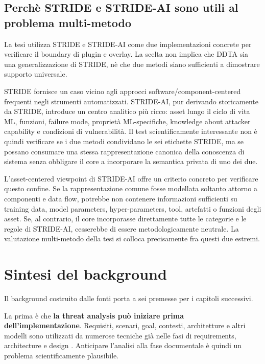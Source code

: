 \documentclass[12pt,a4paper,oneside]{report}
\begin{document}
\subsection{Perchè STRIDE e STRIDE-AI sono utili al problema multi-metodo}

La tesi utilizza STRIDE e STRIDE-AI come due implementazioni concrete per verificare il boundary di plugin e overlay. La scelta non implica che DDTA sia una generalizzazione di STRIDE, nè che due metodi siano sufficienti a dimostrare supporto universale.

STRIDE fornisce un caso vicino agli approcci software/component-centered frequenti negli strumenti automatizzati. STRIDE-AI, pur derivando storicamente da STRIDE, introduce un centro analitico più ricco: asset lungo il ciclo di vita ML, funzioni, failure mode, proprietà ML-specifiche, knowledge about attacker capability e condizioni di vulnerabilità. Il test scientificamente interessante non è quindi verificare se i due metodi condividano le sei etichette STRIDE, ma se possano consumare una stessa rappresentazione canonica della conoscenza di sistema senza obbligare il core a incorporare la semantica privata di uno dei due.

L'asset-centered viewpoint di STRIDE-AI offre un criterio concreto per verificare questo confine. Se la rappresentazione comune fosse modellata soltanto attorno a componenti e data flow, potrebbe non contenere informazioni sufficienti su training data, model parameters, hyper-parameters, tool, artefatti o funzioni degli asset. Se, al contrario, il core incorporasse direttamente tutte le categorie e le regole di STRIDE-AI, cesserebbe di essere metodologicamente neutrale. La valutazione multi-metodo della tesi si colloca precisamente fra questi due estremi.

\section{Sintesi del background}

Il background costruito dalle fonti porta a sei premesse per i capitoli successivi.

La prima è che \textbf{la threat analysis può iniziare prima dell'implementazione}. Requisiti, scenari, goal, contesti, architetture e altri modelli sono utilizzati da numerose tecniche già nelle fasi di requirements, architecture e design \citep{tuma2018threatanalysis}. Anticipare l'analisi alla fase documentale è quindi un problema scientificamente plausibile.
\end{document}
